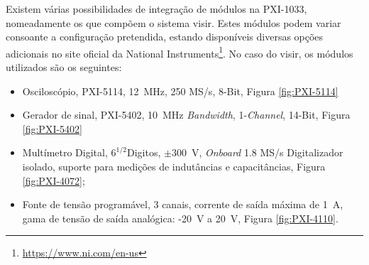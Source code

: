 Existem várias possibilidades de integração de módulos na PXI-1033, nomeadamente os que compõem o sistema \acrshort{visir}. Estes módulos podem variar consoante a configuração pretendida, estando disponíveis diversas opções adicionais no site oficial da National Instruments\footnote{\url{https://www.ni.com/en-us}}. No caso do \acrshort{visir}, os módulos utilizados são os seguintes:
\begin{itemize}
    \item Osciloscópio, PXI-5114, \SI{12}{\MHz}, 250 MS/s, 8-Bit, Figura \ref{fig:PXI-5114}
    \item Gerador de sinal, PXI-5402, \SI{10}{\MHz} \textit{Bandwidth}, 1-\textit{Channel}, 14-Bit, Figura \ref{fig:PXI-5402}  
    \item Multímetro Digital, \(6^{1/2} \)Digitos, \(\pm\)\SI{300}{\volt}, \textit{Onboard} 1.8 MS/s Digitalizador isolado, suporte para medições de indutâncias e capacitâncias, Figura \ref{fig:PXI-4072};
    \item Fonte de tensão programável, 3 canais, corrente de saída máxima de \SI{1}{\ampere}, gama de tensão de saída analógica: -\SI{20}{\volt} a \SI{20}{\volt}, Figura {\ref{fig:PXI-4110}}.
\end{itemize}

